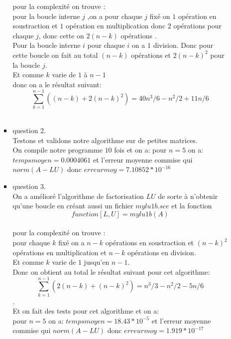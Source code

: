 \documentclass[]{article}
\begin{document}
\begin{itemize}
\begin{itemize}
\begin{itemize}
pour la complexité on trouve :\\pour la boucle interne $j$ ,on a pour chaque $j$ fixé on $1$ opération en soustraction et $1$ opération en multiplication donc $2$ opérations pour chaque $j$, donc cette on $2(n - k)$ opérations .\\
Pour la boucle interne $i$ pour chaque $i$ on a $1$ division. Donc pour cette boucle on fait au total $(n-k)$ opérations et $2(n-k)^{2}$ pour la boucle $j$.\\ Et comme $k$ varie de $1$ à $n - 1$ \\
donc on a le résultat suivant: $$\sum_{k=1}^{n-1}((n - k) +2(n-k)^{2})=40n^{3}/6 -n^{2}/2 +11n/6$$\\
\item{question 2.\\}
Testons et validons notre algorithme sur de petites matrices.\\

On compile notre programme $10$ fois et on a:
pour $n= 5$ on a: $tempsmoyen= 0.0004061$ et l'erreur moyenne commise qui $norm(A - LU) $ donc $erreurmoy= 7.10852*10^{-16}$\\

\item{question 3.\\}
On a amélioré l'algorithme de factorisation $LU$ de sorte à n'obtenir qu'une boucle en créant aussi un fichier $mylu1b.sce$ et la fonction $$function[L,U]=mylu1b(A)$$\\
pour la complexité on trouve :\\
pour chaque  $k$ fixé on a $n - k$ opérations en soustraction et $(n - k)^{2}$ opérations en multiplication et  $n - k$ opérations en division.\\ 
Et comme $k$ varie de $1$ jusqu'en $n - 1$.\\
Donc on obtient au total le résultat suivant pour cet algorithme:$$\sum_{k=1}^{n-1}(2(n - k) +(n-k)^{2})= n^{3}/3 -n^{2}/2 -5n/6$$.\\
Et on fait des tests pour cet algorithme et on a:\\
pour $n= 5$ on a: $tempsmoyen= 18.43*10^{-5}$ et l'erreur moyenne commise qui $norm(A - LU) $ donc $erreurmoy= 1.919*10^{-17}$\\
\\



































\end{itemize}
\end{itemize}
\end{itemize}
\end{document}
